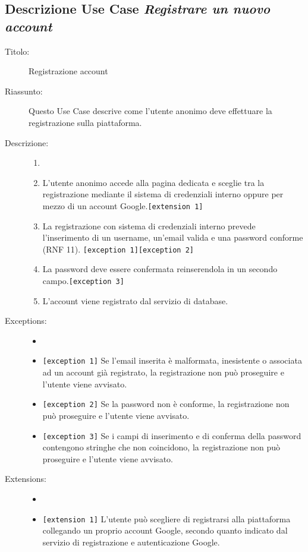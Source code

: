 \documentclass[11pt, a4paper]{article}
\theoremstyle{definition} %
\begin{document}
\subsection*{Descrizione Use Case \textit{Registrare un nuovo account}}
\begin{description}
    \item[Titolo:] Registrazione account
    
    \item[Riassunto:] Questo Use Case descrive come l'utente anonimo deve
    effettuare la registrazione sulla piattaforma.

    \item[Descrizione:]
    \begin{enumerate}
        \item[]
        \item L'utente anonimo accede alla pagina dedicata e sceglie tra la registrazione mediante il sistema di credenziali interno oppure per mezzo di un account Google.\texttt{[extension 1]}
        \item La registrazione con sistema di credenziali interno prevede l'inserimento di un username, un'email valida e una password conforme (RNF 11). \verb|[exception 1]|\verb|[exception 2]|
        \item La password deve essere confermata reinserendola in un secondo campo.\verb|[exception 3]|
        \item L'account viene registrato dal servizio di database.
    \end{enumerate}
    
    \item[Exceptions:]
    \begin{itemize}
        \item[]
        \item \verb|[exception 1]| Se l'email inserita è malformata, inesistente o associata ad un account già registrato, la registrazione non può proseguire e l'utente viene avvisato.
        \item \verb|[exception 2]| Se la password non è conforme, la registrazione non può proseguire e l'utente viene avvisato.
        \item \verb|[exception 3]| Se i campi di inserimento e di conferma della password contengono stringhe che non coincidono, la registrazione non può proseguire e l'utente viene avvisato.
    \end{itemize}

    \item[Extensions:]
    \begin{itemize}
        \item[]
        \item \texttt{[extension 1]} L'utente può scegliere di registrarsi alla piattaforma collegando un proprio account Google, secondo quanto indicato dal servizio di registrazione e autenticazione Google.
    \end{itemize}
\end{description}
\end{document}
